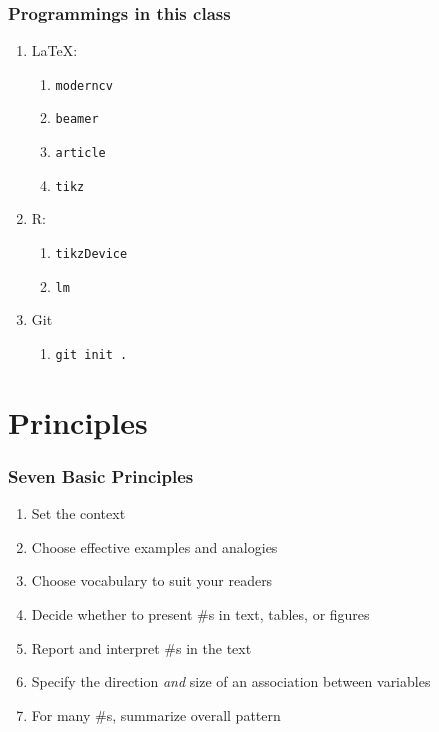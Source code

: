 \documentclass[compress,handout,10pt]{beamer}
\let\olditem\item
\renewcommand{\item}{\setlength{\itemsep}{0.5\baselineskip}\olditem}
\begin{document}
\begin{frame}
    \frametitle{Programmings in this class}
    \begin{enumerate}
        \item \LaTeX: 
            \begin{enumerate}
                \item \texttt{moderncv}
                \item \texttt{beamer}
                \item \texttt{article}
                \item \texttt{tikz}
            \end{enumerate}
        \item R:
            \begin{enumerate}
                \item \texttt{tikzDevice}
                \item \texttt{lm}
            \end{enumerate}
        \item Git
            \begin{enumerate}
                \item \texttt{git init .}
            \end{enumerate}
    \end{enumerate}
\end{frame}

\section{Principles}
\begin{frame}
    \frametitle{Seven Basic Principles}
     \begin{enumerate}
         \item Set the context 
         \item Choose effective examples and analogies
         \item Choose vocabulary to suit your readers
         \item Decide whether to present \#s in text, tables, or figures
         \item Report and interpret \#s in the text
         \item Specify the direction \emph{and} size of an association between variables
         \item For many \#s, summarize overall pattern 
     \end{enumerate}
\end{frame}
\end{document}
